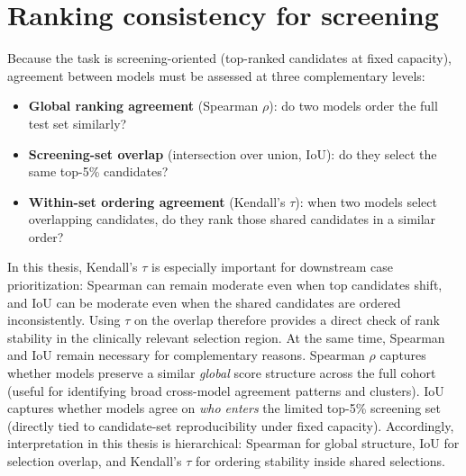 \section{Ranking consistency for screening}
Because the task is screening-oriented (top-ranked candidates at fixed capacity), agreement between models must be assessed at three complementary levels:
\begin{itemize}
  \item \textbf{Global ranking agreement} (Spearman \(\rho\)): do two models order the full test set similarly?
  \item \textbf{Screening-set overlap} (intersection over union, IoU): do they select the same top-5\% candidates?
  \item \textbf{Within-set ordering agreement} (Kendall's \(\tau\)): when two models select overlapping candidates, do they rank those shared candidates in a similar order?
\end{itemize}
In this thesis, Kendall's \(\tau\) is especially important for downstream case prioritization: Spearman can remain moderate even when top candidates shift, and IoU can be moderate even when the shared candidates are ordered inconsistently.
Using \(\tau\) on the overlap therefore provides a direct check of rank stability in the clinically relevant selection region.
At the same time, Spearman and IoU remain necessary for complementary reasons.
Spearman \(\rho\) captures whether models preserve a similar \emph{global} score structure across the full cohort (useful for identifying broad cross-model agreement patterns and clusters).
IoU captures whether models agree on \emph{who enters} the limited top-5\% screening set (directly tied to candidate-set reproducibility under fixed capacity).
Accordingly, interpretation in this thesis is hierarchical: Spearman for global structure, IoU for selection overlap, and Kendall's \(\tau\) for ordering stability inside shared selections.

